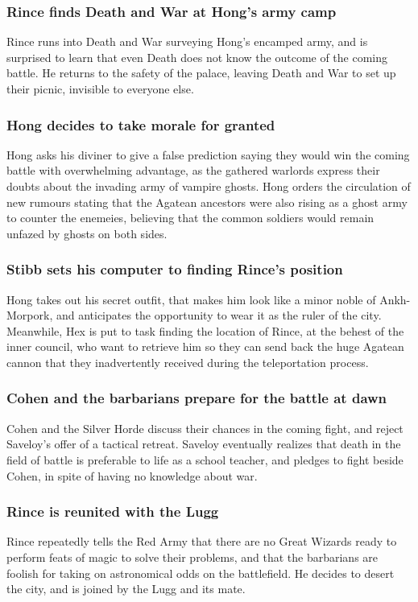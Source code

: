\subsubsection{\Gls{Rince} finds \Gls{Death} and \Gls{War} at \Gls{Hong}'s army camp}
\Gls{Rince} runs into \Gls{Death} and \Gls{War} surveying \Gls{Hong}'s encamped army, and is
surprised to learn that even \Gls{Death} does not know the outcome of the coming battle. He returns
to the safety of the palace, leaving \Gls{Death} and \Gls{War} to set up their picnic, invisible to
everyone else.

\subsubsection{\Gls{Hong} decides to take morale for granted}
\Gls{Hong} asks his diviner to give a false prediction saying they would win the coming battle with
overwhelming advantage, as the gathered warlords express their doubts about the invading army of
vampire ghosts. \Gls{Hong} orders the circulation of new rumours stating that the Agatean ancestors
were also rising as a ghost army to counter the enemeies, believing that the common soldiers would
remain unfazed by ghosts on both sides.

\subsubsection{\Gls{Stibb} sets his computer to finding \Gls{Rince}'s position}
\Gls{Hong} takes out his secret outfit, that makes him look like a minor noble of Ankh-Morpork, and
anticipates the opportunity to wear it as the ruler of the city. Meanwhile, \Gls{Hex} is put to task
finding the location of \Gls{Rince}, at the behest of the inner council, who want to retrieve him
so they can send back the huge Agatean cannon that they inadvertently received during the
teleportation process.

\subsubsection{\Gls{Cohen} and the barbarians prepare for the battle at dawn}
\Gls{Cohen} and the Silver Horde discuss their chances in the coming fight, and reject
\Gls{Saveloy}'s offer of a tactical retreat. \Gls{Saveloy} eventually realizes that death in the
field of battle is preferable to life as a school teacher, and pledges to fight beside \Gls{Cohen},
in spite of having no knowledge about war.

\subsubsection{\Gls{Rince} is reunited with the \Gls{Lugg}}
\Gls{Rince} repeatedly tells the Red Army that there are no Great Wizards ready to perform feats of
magic to solve their problems, and that the barbarians are foolish for taking on astronomical odds
on the battlefield. He decides to desert the city, and is joined by the \Gls{Lugg} and its mate.

